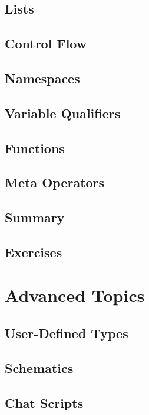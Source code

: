 \documentclass[oneside]{book}
\begin{document}
\section{Lists}

\section{Control Flow}
\blindtext

\section{Namespaces}
\blindtext

\section{Variable Qualifiers}
\blindtext

\section{Functions}
\blindtext

\section{Meta Operators}
\blindtext

\section{Summary}
\blindtext

\section{Exercises}
\blindtext

\chapter{Advanced Topics}
\blindtext

\section{User-Defined Types}
\blindtext

\section{Schematics}
\blindtext

\section{Chat Scripts}
\blindtext
\end{document}

